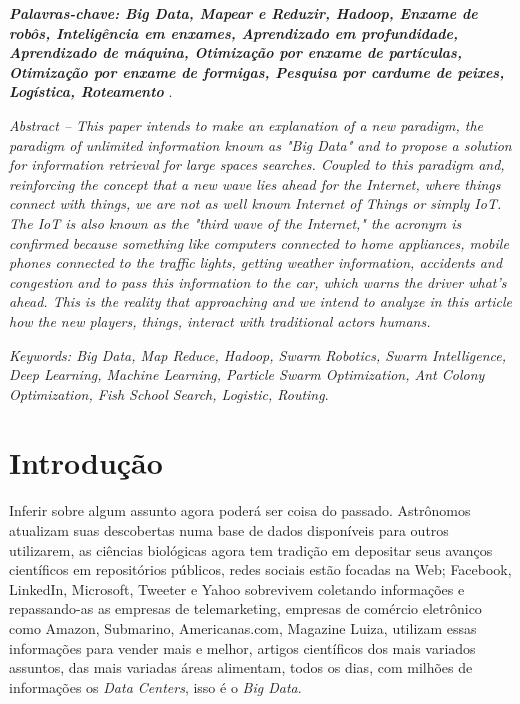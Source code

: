 \documentclass[conference,compsoc]{IEEEtran}
\begin{document}
\vspace{0.1cm}

\textit{\textbf{Palavras-chave: Big Data, Mapear e Reduzir, Hadoop, Enxame de robôs, Inteligência em enxames, Aprendizado em profundidade, Aprendizado de máquina, Otimização por enxame de partículas, Otimização por enxame de formigas, Pesquisa por cardume de peixes, Logística, Roteamento }}.

\vspace{0.1cm}

\textit{Abstract -- This paper intends to make an explanation of a new paradigm, the paradigm of unlimited information known as "Big Data" and to propose a solution for information retrieval for large spaces searches. Coupled to this paradigm and, reinforcing the concept that a new wave lies ahead for the Internet, where things connect with things, we are not as well known Internet of Things   or simply IoT. The IoT is also known as the "third wave of the Internet," the acronym is confirmed because something like computers connected to home appliances, mobile phones connected to the traffic lights, getting weather information, accidents and congestion and to pass this information to the car, which warns the driver what's ahead. This is the reality that approaching and we intend to analyze in this article how the new players, things, interact with traditional actors humans.}

\textit{Keywords: Big Data, Map Reduce, Hadoop, Swarm Robotics, Swarm Intelligence, Deep Learning, Machine Learning, Particle Swarm Optimization, Ant Colony Optimization, Fish School Search, Logistic, Routing}.



%
\IEEEpeerreviewmaketitle



\section{Introdução}

Inferir sobre algum assunto agora poderá ser coisa do passado. Astrônomos atualizam suas descobertas numa base de 
dados disponíveis para outros utilizarem, as ciências biológicas agora tem tradição em depositar seus avanços 
científicos em repositórios públicos, redes sociais estão focadas na Web; Facebook, 
LinkedIn, Microsoft, Tweeter e Yahoo sobrevivem coletando informações e repassando-as as empresas de telemarketing, 
empresas de comércio eletrônico como Amazon, Submarino, Americanas.com, Magazine Luiza, utilizam essas informações 
para vender mais e melhor, artigos científicos dos mais variados assuntos, das mais variadas áreas alimentam, 
todos os dias,  com milhões de informações os \textit{Data Centers}, isso é o \textit{Big Data}.
\end{document}
